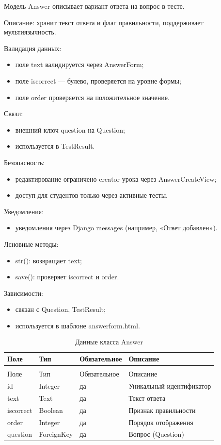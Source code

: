 Модель Answer описывает вариант ответа на вопрос в тесте.

Описание: хранит текст ответа и флаг правильности, поддерживает мультиязычность.

Валидация данных:
	\begin{itemize}
		\item поле text валидируется через AnswerForm;
		\item поле iscorrect — булево, проверяется на уровне формы;
		\item поле order проверяется на положительное значение.
	\end{itemize}
	
Связи:
	\begin{itemize}
		\item внешний ключ question на Question;
		\item используется в TestResult.
	\end{itemize}
	
Безопасность:
	\begin{itemize}
		\item редактирование ограничено creator урока через AnswerCreateView;
		\item доступ для студентов только через активные тесты.
	\end{itemize}
	
Уведомления:
	\begin{itemize}
		\item уведомления через Django messages (например, «Ответ добавлен»).
	\end{itemize}
	
Лсновные методы:
	\begin{itemize}
		\item str(): возвращает text;
		\item save(): проверяет iscorrect и order.
	\end{itemize}
	
Зависимости:
	\begin{itemize}
		\item связан с Question, TestResult;
		\item используется в шаблоне answerform.html.
	\end{itemize}


\begin{xltabular}{\textwidth}{|l|l|l|X|}
	\caption{Данные класса Answer\label{tab:answer_attributes}}\\
	\hline
	Поле & Тип & Обязательное & Описание \\ \hline
	\endfirsthead
	\\
	\hline
	Поле & Тип & Обязательное & Описание \\ \hline
	\endhead
	id & Integer & да & Уникальный идентификатор \\ \hline
	text & Text & да & Текст ответа \\ \hline
	iscorrect & Boolean & да & Признак правильности \\ \hline
	order & Integer & да & Порядок отображения \\ \hline
	question & ForeignKey & да & Вопрос (Question) \\ \hline
\end{xltabular}

